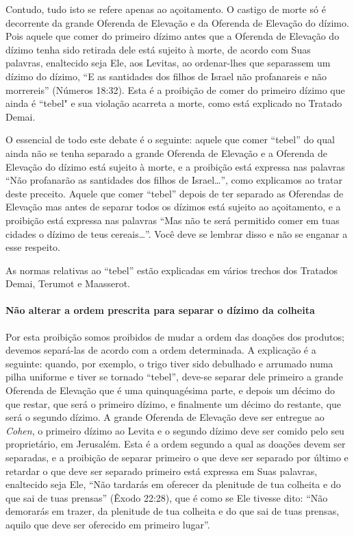 Contudo, tudo isto se refere apenas ao açoitamento. O castigo de morte
só é decorrente da grande Oferenda de Elevação e da Oferenda de
Elevação do dízimo. Pois aquele que comer do primeiro dízimo antes que
a Oferenda de Elevação do dízimo tenha sido retirada dele está sujeito
à morte, de acordo com Suas palavras, enaltecido seja Ele, aos Levitas,
ao ordenar-lhes que separassem um dízimo do dízimo, ``E as santidades
dos filhos de Israel não profanareis e não morrereis'' (Números 18:32).
Esta é a proibição de comer do primeiro dízimo que ainda é ``tebel" e
sua violação acarreta a morte, como está explicado no Tratado Demai.

O essencial de todo este debate é o seguinte: aquele que comer
``tebel'' do qual ainda não se tenha separado a grande Oferenda de
Elevação e a Oferenda de Elevação do dízimo está sujeito à morte, e a
proibição está expressa nas palavras ``Não profanarão as santidades dos
filhos de Israel\ldots{}'', como explicamos ao tratar deste preceito. Aquele
que comer ``tebel'' depois de ter separado as Oferendas de Elevação mas
antes de separar todos os dízimos está sujeito ao açoitamento, e a
proibição está expressa nas palavras ``Mas não te será permitido comer
em tuas cidades o dízimo de teus cereais\ldots{}''. Você deve se lembrar
disso e não se enganar a esse respeito.

As normas relativas ao ``tebel'' estão explicadas em vários trechos dos
Tratados Demai, Terumot e Maasserot.

\paragraph{Não alterar a ordem prescrita para separar o dízimo da colheita}

Por esta proibição somos proibidos de mudar a ordem das doações dos
produtos; devemos separá-las de acordo com a ordem determinada. A
explicação é a seguinte: quando, por exemplo, o trigo tiver sido
debulhado e arrumado numa pilha uniforme e tiver se tornado ``tebel'',
deve-se separar dele primeiro a grande Oferenda de Elevação que é uma
quinquagésima parte, e depois um décimo do que restar, que será o
primeiro dízimo, e finalmente um décimo do restante, que será o segundo
dízimo. A grande Oferenda de Elevação deve ser entregue ao \textit{Cohen}, o
primeiro dízimo ao Levita e o segundo dízimo deve ser comido pelo seu
proprietário, em Jerusalém. Esta é a ordem segundo a qual as doações
devem ser separadas, e a proibição de separar primeiro o que deve ser
separado por último e retardar o que deve ser separado primeiro está
expressa em Suas palavras, enaltecido seja Ele, ``Não tardarás em
oferecer da plenitude de tua colheita e do que sai de tuas prensas''
(Êxodo 22:28), que é como se Ele tivesse dito: ``Não demorarás em
trazer, da plenitude de tua colheita e do que sai de tuas prensas, aquilo que deve ser oferecido em primeiro lugar''.

